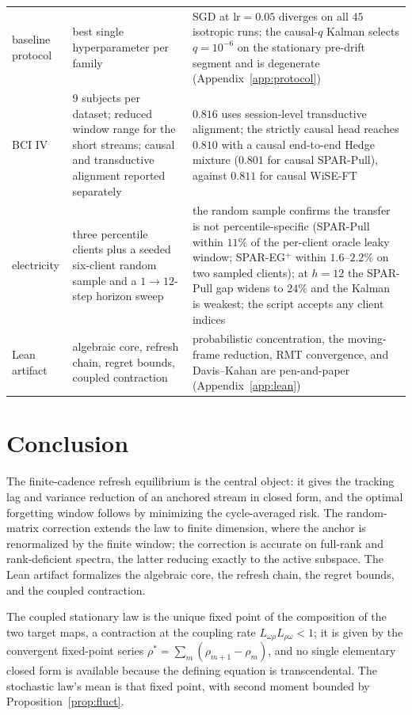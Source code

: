 \documentclass[10pt]{article}
\begin{document}
\begin{table}[t]
\begin{tabular}{p{1.15in}p{2.1in}p{2.55in}}
baseline protocol & best single hyperparameter per family & SGD at $\mathrm{lr}=0.05$ diverges on all $45$ isotropic runs; the causal-$q$ Kalman selects $q=10^{-6}$ on the stationary pre-drift segment and is degenerate (Appendix~\ref{app:protocol}) \\
BCI IV & 9 subjects per dataset; reduced window range for the short streams; causal and transductive alignment reported separately & $0.816$ uses session-level transductive alignment; the strictly causal head reaches $0.810$ with a causal end-to-end Hedge mixture ($0.801$ for causal SPAR-Pull), against $0.811$ for causal WiSE-FT \\
electricity & three percentile clients plus a seeded six-client random sample and a $1\to12$-step horizon sweep & the random sample confirms the transfer is not percentile-specific (SPAR-Pull within $11\%$ of the per-client oracle leaky window; SPAR-EG$^+$ within $1.6$--$2.2\%$ on two sampled clients); at $h=12$ the SPAR-Pull gap widens to $24\%$ and the Kalman is weakest; the script accepts any client indices \\
Lean artifact & algebraic core, refresh chain, regret bounds, coupled contraction & probabilistic concentration, the moving-frame reduction, RMT convergence, and Davis--Kahan are pen-and-paper (Appendix~\ref{app:lean}) \\
\bottomrule
\end{tabular}
\end{table}

\section{Conclusion}
The finite-cadence refresh equilibrium is the central object: it gives the tracking lag and variance reduction of an anchored stream in closed form, and the optimal forgetting window follows by minimizing the cycle-averaged risk.
The random-matrix correction extends the law to finite dimension, where the anchor is renormalized by the finite window; the correction is accurate on full-rank and rank-deficient spectra, the latter reducing exactly to the active subspace.
The Lean artifact formalizes the algebraic core, the refresh chain, the regret bounds, and the coupled contraction.

The coupled stationary law is the unique fixed point of the composition of the two target maps, a contraction at the coupling rate $L_{\omega\rho}L_{\rho\omega}<1$; it is given by the convergent fixed-point series $\rho^*=\sum_m(\rho_{m+1}-\rho_m)$, and no single elementary closed form is available because the defining equation is transcendental.
The stochastic law's mean is that fixed point, with second moment bounded by Proposition~\ref{prop:fluct}.




\clearpage
\appendix
\setcounter{theorem}{0}
\setcounter{lemma}{0}
\setcounter{proposition}{0}
\setcounter{corollary}{0}
\renewcommand{\thetheorem}{\thesection.\arabic{theorem}}
\renewcommand{\thelemma}{\thesection.\arabic{lemma}}
\renewcommand{\theproposition}{\thesection.\arabic{proposition}}
\renewcommand{\thecorollary}{\thesection.\arabic{corollary}}

\end{document}
